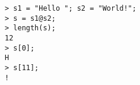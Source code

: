 \begin{center}\begin{minipage}{15cm}\begin{Verbatim}[frame=single]
> s1 = "Hello "; s2 = "World!";
> s = s1@s2;
> length(s);
12
> s[0];
H
> s[11];
!
\end{Verbatim}
\end{minipage}\end{center}

